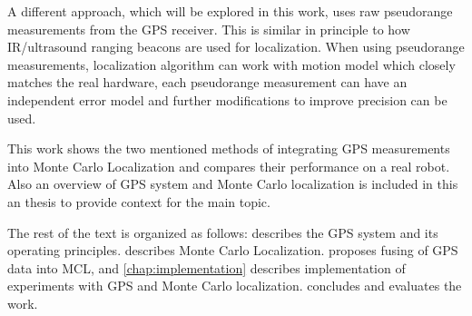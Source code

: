 A different approach, which will be explored in this work, uses raw
pseudorange measurements from the GPS receiver.
This is similar in principle to how IR/ultrasound ranging beacons are used for localization.
When using pseudorange measurements, localization algorithm can work with motion model
which closely matches
the real hardware, each pseudorange measurement can have an
independent error model and further modifications to improve precision can be used.


\vspace{1.5em}


This work shows the two mentioned  methods of integrating GPS measurements
into Monte Carlo Localization and compares their performance on a real robot.
Also an overview of GPS system and Monte Carlo localization is included in
this an thesis to provide context for the main topic.


The rest of the text is organized as follows:
 describes the GPS system and its operating principles.
 describes Monte Carlo Localization.
 proposes fusing of GPS data into MCL, and
\cref{chap:implementation} describes implementation of experiments with GPS and
Monte Carlo localization.
 concludes and evaluates the work.
